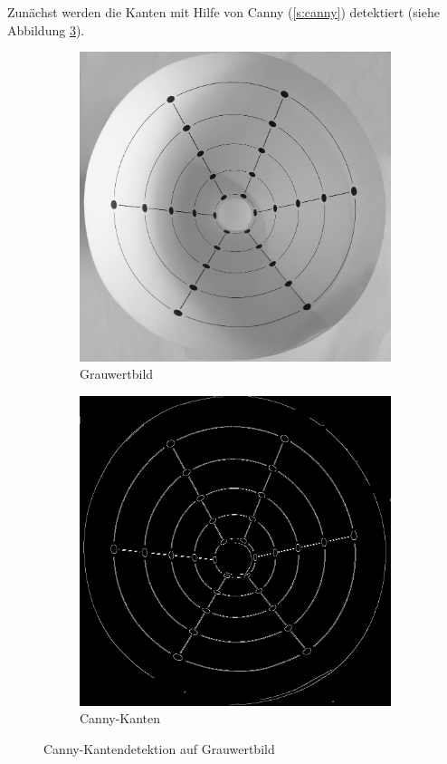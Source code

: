 Zunächst werden die Kanten mit Hilfe von Canny (\ref{s:canny}) detektiert (siehe Abbildung \ref{fig:canny}). 

\begin{figure}[!htb]
	\centering
	\begin{subfigure}{.5\textwidth}
		\centering
		\includegraphics[width=.9\textwidth]{images/grey.png}
		\caption{Grauwertbild}
		\label{fig:beforeCanny}
	\end{subfigure}%
	\begin{subfigure}{.5\textwidth}
		\centering
		\includegraphics[width=.9\textwidth]{images/canny.png}
		\caption{Canny-Kanten}
		\label{fig:afterCanny}
	\end{subfigure}
	\caption{Canny-Kantendetektion auf Grauwertbild}
	\label{fig:canny}
\end{figure}

